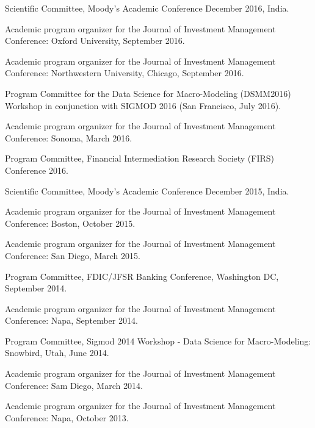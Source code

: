 \documentclass{article}
\begin{document}
\begin{description}
\begin{etaremune}
\item Scientific Committee, Moody's Academic Conference December 2016, India. 

\item Academic program organizer for the Journal of Investment Management
Conference: Oxford University, September 2016. 

\item Academic program organizer for the Journal of Investment Management
Conference: Northwestern University, Chicago, September 2016. 

\item Program Committee for the Data Science for Macro-Modeling (DSMM2016) Workshop in conjunction with SIGMOD 2016 (San Francisco, July 2016).


\item Academic program organizer for the Journal of Investment Management
Conference: Sonoma, March 2016. 

\item Program Committee, Financial Intermediation Research Society (FIRS) Conference 2016. 

\item Scientific Committee, Moody's Academic Conference December 2015, India. 

\item Academic program organizer for the Journal of Investment Management
Conference: Boston, October 2015. 

\item Academic program organizer for the Journal of Investment Management
Conference: San Diego, March 2015. 

\item Program Committee, FDIC/JFSR Banking Conference, Washington DC, September 2014. 

\item Academic program organizer for the Journal of Investment Management
Conference: Napa, September 2014. 

\item Program Committee, Sigmod 2014 Workshop - Data Science for Macro-Modeling: Snowbird, Utah, June 2014.  

\item Academic program organizer for the Journal of Investment Management
Conference: Sam Diego, March 2014. 

\item Academic program organizer for the Journal of Investment Management
Conference: Napa, October 2013. 


\end{etaremune}
\end{description}
\end{document}
